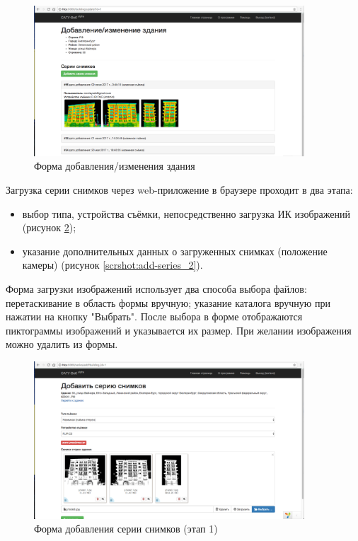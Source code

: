 	\pagebreak

	\begin{figure}[t!]
		\centering
		\includegraphics[width=0.9\textwidth]{images/scrshots/update_1}
		\caption{Форма добавления/изменения здания}
		\label{scrshot:update_1}
	\end{figure}

	Загрузка серии снимков через web-приложение в браузере проходит в два этапа: 

	\begin{itemize}
		\item выбор типа, устройства съёмки, непосредственно загрузка ИК изображений (рисунок \ref{scrshot:add-series_1});
		\item указание дополнительных данных о загруженных снимках (положение камеры) (рисунок \ref{scrshot:add-series_2}).
	\end{itemize}
 
	Форма загрузки изображений использует два способа выбора файлов: перетаскивание в область формы вручную; указание каталога вручную при нажатии на кнопку "Выбрать". После выбора в форме отображаются пиктограммы изображений и указывается их размер. При желании изображения можно удалить из формы.

	\pagebreak

	\begin{figure}[t!]
		\centering
		\includegraphics[width=0.9\textwidth]{images/scrshots/add-series_1}
		\caption{Форма добавления серии снимков (этап 1)}
		\label{scrshot:add-series_1}
	\end{figure}

